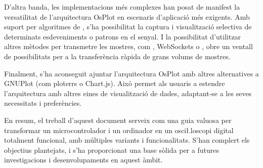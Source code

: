 \documentclass{tfgitic}[2023/07/07]
\begin{document}
D'altra banda, les implementacions més complexes han posat de manifest
la versatilitat de l'arquitectura OsPlot en escenaris d'aplicació més
exigents. Amb suport per algoritmes de , s'ha
possibilitat la captura i visualització selectiva de determinats
esdeveniments o patrons en el senyal. I la possibilitat d'utilitzar
altres mètodes per transmetre les mostres, com , WebSockets
o , obre un ventall de possibilitats per a la transferència
ràpida de grans volums de mostres.

Finalment, s'ha aconseguit ajuntar l'arquitectura OsPlot amb altres
alternatives a GNUPlot (com ploterrs o Chart.js). Això permet als
usuaris a estendre l'arquitectura amb altres eines de visualització de
dades, adaptant-se a les seves necessitats i preferències.

En resum, el treball d'aquest document serveix com una guia valuosa per
transformar un microcontrolador i un ordinador en un osci\l.loscopi
digital totalment funcional, amb múltiples variants i funcionalitats.
S'han complert els objectius plantejats, i s'ha proporcionat una base
sòlida per a futures investigacions i desenvolupaments en aquest
àmbit.

\printbibliography
\end{document}
